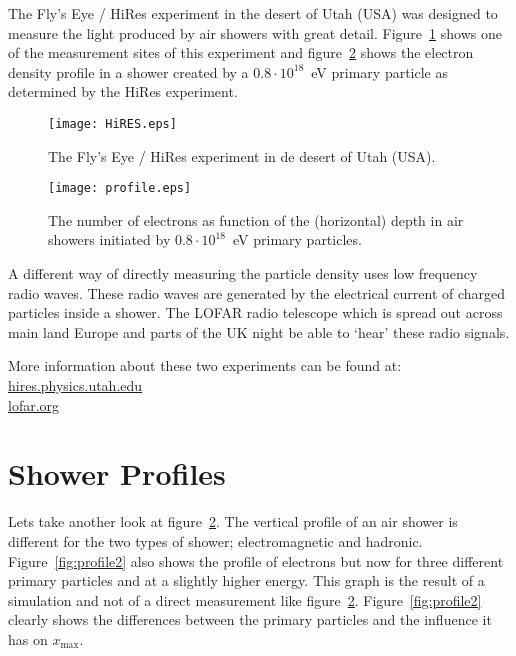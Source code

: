 The Fly's Eye / HiRes experiment in the desert of Utah (USA) was designed to measure the light produced by air showers with great detail. Figure~\ref{fig:HiRES} shows one of the measurement sites of this experiment and figure~\ref{fig:profile} shows the electron density profile in a shower created by a $0.8 \cdot 10^{18}$~eV primary particle as determined by the HiRes experiment.

\begin{figure}\begin{center}
\texttt{[image: HiRES.eps]}%
\caption{The Fly's Eye / HiRes experiment in de desert of Utah (USA).}\label{fig:HiRES}
\end{center}\end{figure}

\begin{figure}\begin{center}
\texttt{[image: profile.eps]}%
\caption{The number of electrons as function of the (horizontal) depth in air showers initiated by $0.8 \cdot 10^{18}$~eV primary particles.}\label{fig:profile}
\end{center}\end{figure}

A different way of directly measuring the particle density uses low frequency radio waves. These radio waves are generated by the electrical current of charged particles inside a shower. The LOFAR radio telescope which is spread out across main land Europe and parts of the UK night be able to `hear' these radio signals.

More information about these two experiments can be found at:\\
\url{hires.physics.utah.edu} \\
\url{lofar.org}

\section{Shower Profiles}
Lets take another look at figure~\ref{fig:profile}. The vertical profile of an air shower is different for the two types of shower; electromagnetic and hadronic. Figure~\ref{fig:profile2} also shows the profile of electrons but now for three different primary particles and at a slightly higher energy. This graph is the result of a simulation and not of a direct measurement like figure~\ref{fig:profile}. Figure~\ref{fig:profile2} clearly shows the differences between the primary particles and the influence it has on $x_{\mbox{max}}$. 

